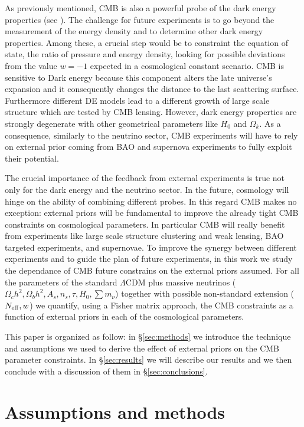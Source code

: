 \documentclass[aps,prd,reprint,superscriptaddress]{revtex4-1}
\newcommand\refsec[1]{\S\ref{sec:#1}}
\begin{document}
As previously mentioned, CMB is also a powerful probe of the dark energy properties (see \cite{2010MNRAS.405.2639J}). The challenge for future experiments is to go beyond the measurement of the energy density and to determine other dark energy properties.
Among these, a crucial step would be to constraint the equation of state, the ratio of pressure and energy density, looking for possible deviations from the value $w=-1$ expected in a cosmological constant scenario. 
CMB is sensitive to Dark energy because this component alters the late universe's expansion and it consequently changes the distance to the last scattering surface. Furthermore different DE models lead to a different growth of large scale structure which are tested by CMB lensing.
However, dark energy properties are strongly degenerate with other geometrical parameters like $H_{0}$ and $\Omega_{k}$. As a consequence, similarly to the neutrino sector, CMB experiments will have to rely on external prior coming from BAO and supernova experiments to fully exploit their potential.

The crucial importance of the feedback from external experiments is true not only for the dark energy and the neutrino sector. 
In the future, cosmology will hinge on the ability of combining different probes. In this regard CMB makes no exception: external priors will be fundamental to improve the already tight CMB constraints on cosmological parameters. 
In particular CMB will really benefit from experiments like large scale structure clustering and weak lensing, BAO targeted experiments, and supernovae. 
To improve the synergy between different experiments and to guide the plan of future experiments, in this work we study the dependance of CMB future constrains on the external priors assumed. For all the parameters of the standard $\Lambda$CDM plus massive neutrinos ($\Omega_c h^2,\Omega_b h^2,A_s,n_s,\tau,H_0,\sum m_\nu$) together with possible non-standard extension ($N_{\rm eff},w$) we quantify, using a Fisher matrix approach, the CMB constraints as a function of external priors in each of the cosmological parameters.   

This paper is organized as follow: in \refsec{methods} we introduce the technique and assumptions we used to derive the effect of external priors on the CMB parameter constraints. In \refsec{results} we will describe our results and we then conclude with a discussion of them in \refsec{conclusions}.



\section{Assumptions and methods \label{sec:methods}}
\end{document}
